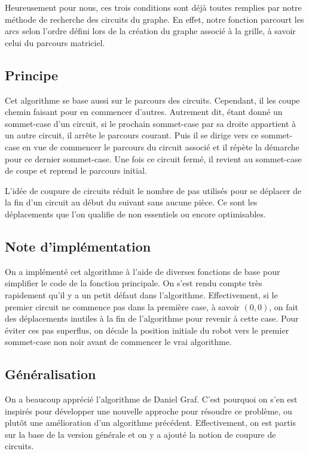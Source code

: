 \documentclass[12pt,a4paper]{article}
\begin{document}
Heureusement pour nous, ces trois conditions sont d\'ej\`a toutes remplies par
notre m\'ethode de recherche des circuits du graphe. En effet, notre fonction 
parcourt les arcs selon l'ordre d\'efini lors de la cr\'eation du graphe 
associ\'e \`a la grille, \`a savoir celui du parcours matriciel.

\subsection*{Principe}
Cet algorithme se base aussi sur le parcours des circuits. Cependant, il les 
coupe chemin faisant pour en commencer d'autres. Autrement dit, \'etant donn\'e 
un sommet-case d'un circuit, si le prochain sommet-case par sa droite appartient 
\`a un autre circuit, il arr\^ete le parcours courant. Puis il se dirige vers ce 
sommet-case en vue de commencer le parcours du circuit associ\'e et il 
r\'ep\`ete la d\'emarche pour ce dernier sommet-case. Une fois ce circuit 
ferm\'e, il revient au sommet-case de coupe et reprend le parcours initial.

L'id\'ee de coupure de circuits r\'eduit le nombre de pas utilis\'es pour se 
d\'eplacer de la fin d'un circuit au d\'ebut du suivant sans aucune pi\`ece. 
Ce sont les d\'eplacements que l'on qualifie de non essentiels ou encore 
optimisables.

\subsection*{Note d'impl\'ementation}
On a impl\'ement\'e cet algorithme \`a l'aide de diverses fonctions de base 
pour simplifier le code de la fonction principale. On s'est rendu compte tr\`es 
rapidement qu'il y a un petit d\'efaut dans l'algorithme. Effectivement, si le 
premier circuit ne commence pas dans la premi\`ere case, \`a savoir $(0,0)$, on 
fait des d\'eplacements inutiles \`a la fin de l'algorithme pour revenir \`a 
cette case. Pour \'eviter ces pas superflus, on d\'ecale la position initiale 
du robot vers le premier sommet-case non noir avant de commencer le vrai 
algorithme.

\subsection*{G\'en\'eralisation}
On a beaucoup appr\'eci\'e l'algorithme de Daniel Graf. C'est pourquoi on s'en 
est inspir\'es pour d\'evelopper une nouvelle approche pour r\'esoudre ce 
probl\`eme, ou plut\^ot une am\'elioration d'un algorithme pr\'ec\'edent. 
Effectivement, on est partis sur la base de la version g\'en\'erale et on y a 
ajout\'e la notion de coupure de circuits.
\end{document}
